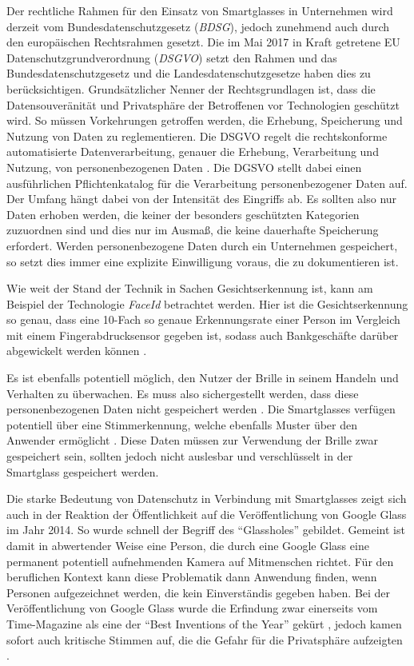 Der rechtliche Rahmen für den Einsatz von Smartglasses in Unternehmen wird derzeit vom Bundesdatenschutzgesetz (\emph{BDSG}), jedoch zunehmend auch durch den europäischen Rechtsrahmen gesetzt. Die im Mai 2017 in Kraft getretene EU Datenschutzgrundverordnung (\emph{DSGVO}) setzt den Rahmen und das Bundesdatenschutzgesetz und die Landesdatenschutzgesetze haben dies zu berücksichtigen. Grundsätzlicher Nenner der Rechtsgrundlagen ist, dass die Datensouveränität und Privatsphäre der Betroffenen vor Technologien geschützt wird. So müssen Vorkehrungen getroffen werden, die Erhebung, Speicherung und Nutzung von Daten zu reglementieren.
Die DSGVO regelt die rechtskonforme automatisierte Datenverarbeitung, genauer die Erhebung, Verarbeitung und Nutzung, von personenbezogenen Daten \cite{Berkemeier2017}. Die DGSVO stellt dabei einen ausführlichen Pflichtenkatalog für die Verarbeitung personenbezogener Daten auf. Der Umfang hängt dabei von der Intensität des Eingriffs ab. Es sollten also nur Daten erhoben werden, die keiner der besonders geschützten Kategorien zuzuordnen sind und dies nur im Ausmaß, die keine dauerhafte Speicherung erfordert. Werden personenbezogene Daten durch ein Unternehmen gespeichert, so setzt dies immer eine explizite Einwilligung voraus, die zu dokumentieren ist.

Wie weit der Stand der Technik in Sachen Gesichtserkennung ist, kann am Beispiel der Technologie \emph{FaceId} betrachtet werden. Hier ist die Gesichtserkennung so genau, dass eine 10-Fach so genaue Erkennungsrate einer Person im Vergleich mit einem Fingerabdrucksensor gegeben ist, sodass auch Bankgeschäfte darüber abgewickelt werden können \cite{Apple2018a}. 
%

Es ist ebenfalls potentiell möglich, den Nutzer der Brille in seinem Handeln und Verhalten zu überwachen. Es muss also sichergestellt werden, dass diese personenbezogenen Daten nicht gespeichert werden \cite[S.~34]{Schwenke2016}. Die Smartglasses verfügen potentiell über eine Stimmerkennung, welche ebenfalls Muster über den Anwender ermöglicht \cite[S.~41]{Schwenke2016}. Diese Daten müssen zur Verwendung der Brille zwar gespeichert sein, sollten jedoch nicht auslesbar und verschlüsselt in der Smartglass gespeichert werden.

Die starke Bedeutung von Datenschutz in Verbindung mit Smartglasses zeigt sich auch in der Reaktion der Öffentlichkeit auf die Veröffentlichung von Google Glass im Jahr 2014. So wurde schnell der Begriff des \enquote{Glassholes} \cite[S.~14]{ThomasDirkMetzgerHelmutNiegemannHrsg2018} gebildet. Gemeint ist damit in abwertender Weise eine Person, die durch eine Google Glass eine permanent potentiell aufnehmenden Kamera auf Mitmenschen richtet. Für den beruflichen Kontext kann diese Problematik dann Anwendung finden, wenn Personen aufgezeichnet werden, die kein Einverständis gegeben haben. Bei der Veröffentlichung von Google Glass wurde die Erfindung zwar einerseits vom Time-Magazine als eine der \enquote{Best Inventions of the Year} gekürt \cite{Bilton2015}, jedoch kamen sofort auch kritische Stimmen auf, die die Gefahr für die Privatsphäre aufzeigten \cite[S.~67]{Schwenke2016}. 

